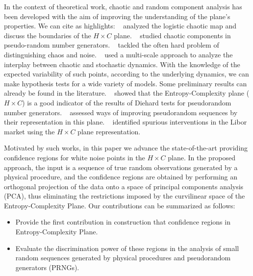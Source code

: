 
In the context of theoretical work, chaotic and random component analysis has been developed with the aim of improving the understanding of the plane's properties. We can cite as highlights:
\citeauthor{GeneralizedStatisticalComplexityMeasuresGeometricalAnalyticalProperties}~ analyzed the logistic chaotic map and discuss the boundaries of the $H \times C$ plane.
\citeauthor{De_Micco_2009}~ studied chaotic components in pseudo-random number generators.
\citeauthor{DistinguishingNoiseFromChaos}~  tackled the often hard problem of distinguishing chaos and noise.
\citeauthor{DistinguishingChaoticStochasticDynamicsTimeSeriesMultiscaleSymbolicApproach}~ used a multi-scale approach to analyze the interplay between chaotic and stochastic dynamics.
With the knowledge of the expected variability of such points, according to the underlying dynamics, we can make hypothesis tests for a wide variety of models.
Some preliminary results can already be found in the literature.
\citeauthor{RandomNumberGeneratorsCausality}~ showed that the Entropy-Complexity plane ($H\times C$) is a good indicator of the results of Diehard tests for pseudorandom number generators.
\citeauthor{De_Micco_2008}~ assessed ways of improving pseudorandom sequences by their representation in this plane.
\citeauthor{LiborInvisibleHand}~ identified spurious interventions in the Libor market using the $H\times C$ plane representation.

Motivated by such works, in this paper we advance the state-of-the-art providing confidence regions for white noise points in the $H\times C$ plane.
In the proposed approach, the input is a sequence of true random observations generated by a physical procedure, and the confidence regions are obtained by performing an orthogonal projection of the data onto a space of principal components analysis (PCA), thus eliminating the restrictions imposed by the curvilinear space of the Entropy-Complexity Plane.
Our contributions can be summarized as follows:
\begin{itemize}
    \item Provide the first contribution in construction that confidence regions in Entropy-Complexity Plane.
    \item Evaluate the discrimination power of these regions in the analysis of small random sequences generated by physical procedures and pseudorandom generators (PRNGs).
\end{itemize}

